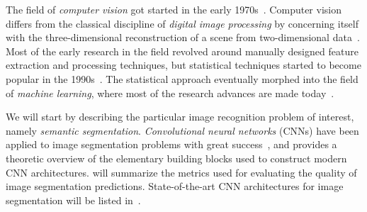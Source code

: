The field of \textit{computer vision} got started in the early 1970s~\cite[p.~10]{computer_vision_history}.
Computer vision differs from the classical discipline of \textit{digital image processing} by concerning itself with the three-dimensional reconstruction of a scene from two-dimensional data~\cite[p.~10]{computer_vision_history}.
Most of the early research in the field revolved around manually designed feature extraction and processing techniques, but statistical techniques started to become popular in the 1990s~\cite[p.~15]{computer_vision_history}.
The statistical approach eventually morphed into the field of \textit{machine learning}, where most of the research advances are made today~\cite[p.~17]{computer_vision_history}.

We will start by describing the particular image recognition problem of interest, namely \textit{semantic segmentation}.
\textit{Convolutional neural networks} (CNNs) have been applied to image segmentation problems with great success~\cite[p.~1]{image_recognition}, and  provides a theoretic overview of the elementary building blocks used to construct modern CNN architectures.
 will summarize the metrics used for evaluating the quality of image segmentation predictions.
State-of-the-art CNN architectures for image segmentation will be listed in~.
